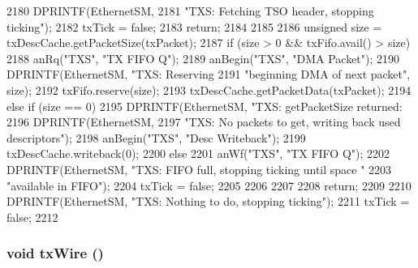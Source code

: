 \begin{DoxyCode}
{{{2180             DPRINTF(EthernetSM,
2181                     "TXS: Fetching TSO header, stopping ticking\n");
2182             txTick = false;
2183             return;
2184         }
2185 
2186         unsigned size = txDescCache.getPacketSize(txPacket);
2187         if (size > 0 && txFifo.avail() > size) {
2188             anRq("TXS", "TX FIFO Q");
2189             anBegin("TXS", "DMA Packet");
2190             DPRINTF(EthernetSM, "TXS: Reserving %
2191                     "beginning DMA of next packet\n", size);
2192             txFifo.reserve(size);
2193             txDescCache.getPacketData(txPacket);
2194         } else if (size == 0) {
2195             DPRINTF(EthernetSM, "TXS: getPacketSize returned: %
2196             DPRINTF(EthernetSM,
2197                     "TXS: No packets to get, writing back used descriptors\n");
2198             anBegin("TXS", "Desc Writeback");
2199             txDescCache.writeback(0);
2200         } else {
2201             anWf("TXS", "TX FIFO Q");
2202             DPRINTF(EthernetSM, "TXS: FIFO full, stopping ticking until space "
2203                     "available in FIFO\n");
2204             txTick = false;
2205         }
2206 
2207 
2208         return;
2209     }
2210     DPRINTF(EthernetSM, "TXS: Nothing to do, stopping ticking\n");
2211     txTick = false;
2212 }
\end{DoxyCode}
\hypertarget{classIGbE_af67ff1365c83adc97fef8753e38f3d9e}{
\subsubsection[{txWire}]{\setlength{\rightskip}{0pt plus 5cm}void txWire ()}}
\label{classIGbE_af67ff1365c83adc97fef8753e38f3d9e}




